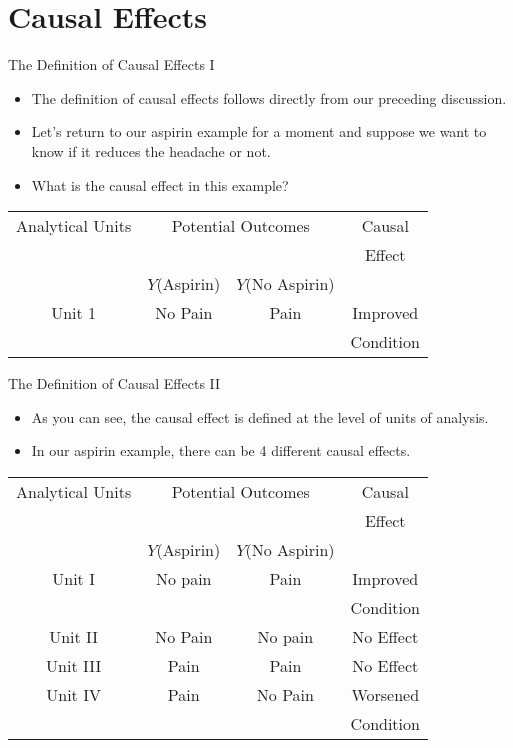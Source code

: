 \documentclass{beamer}
\begin{document}
\section{Causal Effects}
\begin{frame}{The Definition of Causal Effects I}
	\begin{itemize}
		\item The definition of causal effects follows directly from our preceding discussion.
		\item Let's return to our aspirin example for a moment and suppose we want to know if it reduces the headache or not. 
		\item What is the causal effect in this example?
	\end{itemize}
\small
\begin{center}
	\begin{tabular}{  c  c  c c }
		\hline\hline
		Analytical Units & \multicolumn{2}{c}{Potential Outcomes} & Causal \\
		& & & Effect \\
		\cline{2-3}
		& $Y$(Aspirin) & $Y$(No Aspirin) & \\
		\hline
		Unit 1 & No Pain & Pain & Improved \\
		& & & Condition\\
		\hline\hline
	\end{tabular}
\end{center}
\end{frame}
\begin{frame}{The Definition of Causal Effects II}
\begin{itemize}
	\item As you can see, the causal effect is defined at the level of units of analysis.
	\item In our aspirin example, there can be 4 different causal effects. 
\end{itemize}
\small
\begin{center}
	\begin{tabular}{  c  c  c c }
		\hline\hline
		Analytical Units & \multicolumn{2}{c}{Potential Outcomes} & Causal \\
		& & & Effect \\
		\cline{2-3}
		& $Y$(Aspirin) & $Y$(No Aspirin) & \\
		\hline
		Unit I & No pain & Pain & Improved \\
		& & & Condition\\
		Unit II & No Pain & No pain & No Effect \\
		Unit III & Pain & Pain & No Effect \\
		Unit IV & Pain & No Pain & Worsened \\
		& & & Condition\\
		\hline\hline
	\end{tabular}
\end{center}
\end{frame}
\end{document}
